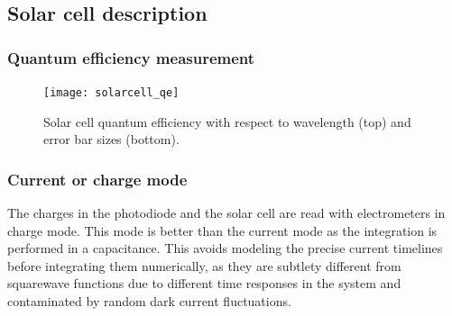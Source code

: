 \subsection{Solar cell description}

\subsubsection{Quantum efficiency measurement}
 

\begin{figure}[!h]
\centering
\texttt{[image: solarcell\_qe]}
\caption{Solar cell quantum efficiency with respect to wavelength (top) and error bar sizes (bottom).}
\end{figure}



\subsubsection{Current or charge mode}

The charges in the photodiode and the solar cell are read with electrometers in charge mode. This mode is better than the current mode as the integration is performed in a capacitance. This avoids modeling the precise current timelines before integrating them numerically, as they are subtlety different from squarewave functions due to different time responses in the system and contaminated by random dark current fluctuations. 


  
